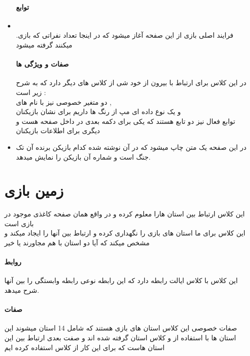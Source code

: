 \documentclass[pdf,titlepage,a4paper]{report}
\begin{document}
\begin{itemize}
		\paragraph{توابع} 

		\item {} \\.فرایند اصلی بازی از این صفحه آغاز میشود که در اینجا تعداد نفراتی که بازی میکنند گرفته میشود
		\paragraph{صفات و ویژگی ها} 
		در این کلاس برای ارتباط با بیرون از خود شی از کلاس های دیگر دارد که به شرح زیر است :
		 \\
		دو متغیر خصوصی نیز با نام های  ,  \\
		 و یک نوع داده ای مپ از رنگ ها داریم برای نشان بازیکنان  \\
		  توابع فعال نیز دو تابع هستند که یکی برای دکمه بعدی در داخل صفحه هست و دیگری برای اطلاعات بازیکنان  \\

		\item {}   در این صفحه یک متن چاپ میشود که در آن نوشته شده کدام بازیکن برنده آن تک جنگ است و شماره آن بازیکن را نمایش میدهد.\\
 
	\end{itemize}

	\newpage
	\section{زمین بازی}
    این کلاس ارتباط بین استان هارا معلوم کرده و در واقع همان صفحه کاغذی موجود در بازی است \\
    این کلاس برای ما استان های بازی را نگهداری کرده و ارتباط بین آنها را ایجاد میکند و مشخص میکند که آیا دو استان با هم مجاورند یا خیر 
    \paragraph{روابط}
	این کلاس با کلاس ایالت رابطه دارد که این رابطه نوعی رابطه وابستگی را بین آنها شرح میدهد.\\
	\paragraph{صفات}
	صفات خصوصی این کلاس استان های بازی هستند که شامل 14 استان میشوند 
	این استان ها با استفاده از  و کلاس استان گرفته شده اند
	و صفت بعدی ارتباط بین این استان هاست که برای این کار از کلاس  استفاده کرده ایم
\end{document}
